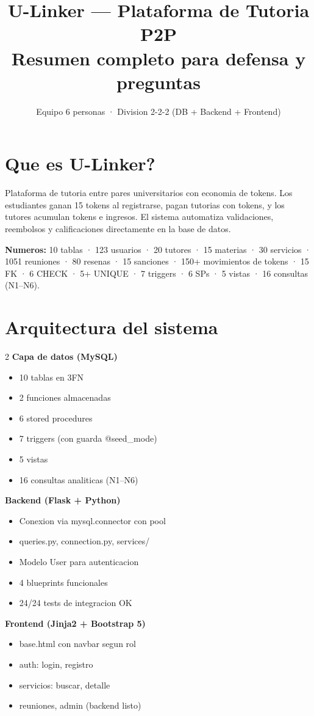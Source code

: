\documentclass[10pt,a4paper]{article}
\title{\textbf{U-Linker --- Plataforma de Tutoria P2P}\\[0.3em]
       \large Resumen completo para defensa y preguntas}
\author{Equipo 6 personas · Division 2-2-2 (DB + Backend + Frontend)}
\date{}
\begin{document}
\maketitle
\thispagestyle{fancy}

\section{Que es U-Linker?}
Plataforma de tutoria entre pares universitarios con economia de tokens. Los estudiantes ganan 15 tokens al registrarse, pagan tutorias con tokens, y los tutores acumulan tokens e ingresos. El sistema automatiza validaciones, reembolsos y calificaciones directamente en la base de datos.

\textbf{Numeros:} 10 tablas · 123 usuarios · 20 tutores · 15 materias · 30 servicios · 1051 reuniones · 80 resenas · 15 sanciones · 150+ movimientos de tokens · 15 FK · 6 CHECK · 5+ UNIQUE · 7 triggers · 6 SPs · 5 vistas · 16 consultas (N1--N6).

\section{Arquitectura del sistema}
\begin{multicols}{2}
\textbf{Capa de datos (MySQL)}
\begin{itemize}
    \item 10 tablas en 3FN
    \item 2 funciones almacenadas
    \item 6 stored procedures
    \item 7 triggers (con guarda @seed\_mode)
    \item 5 vistas
    \item 16 consultas analiticas (N1--N6)
\end{itemize}

\textbf{Backend (Flask + Python)}
\begin{itemize}
    \item Conexion via mysql.connector con pool
    \item queries.py, connection.py, services/
    \item Modelo User para autenticacion
    \item 4 blueprints funcionales
    \item 24/24 tests de integracion OK
\end{itemize}

\textbf{Frontend (Jinja2 + Bootstrap 5)}
\begin{itemize}
    \item base.html con navbar segun rol
    \item auth: login, registro
    \item servicios: buscar, detalle
    \item reuniones, admin (backend listo)
\end{itemize}
\end{multicols}
\end{document}
